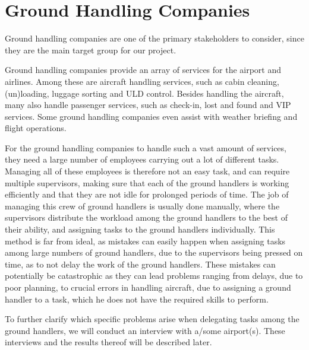 \section{Ground Handling Companies}
Ground handling companies are one of the primary stakeholders to consider, since they are the main target group for our project.

Ground handling companies provide an array of services for the airport and airlines. Among these are aircraft handling services, such as cabin cleaning, (un)loading, luggage sorting and ULD control. Besides handling the aircraft, many also handle passenger services, such as check-in, lost and found and VIP services. Some ground handling companies even assist with weather briefing and flight operations.

For the ground handling companies to handle such a vast amount of services, they need a large number of employees carrying out a lot of different tasks. Managing all of these employees is therefore not an easy task, and can require multiple supervisors, making sure that each of the ground handlers is working efficiently and that they are not idle for prolonged periods of time. The job of managing this crew of ground handlers is usually done manually, where the supervisors distribute the workload among the ground handlers to the best of their ability, and assigning tasks to the ground handlers individually.
This method is far from ideal, as mistakes can easily happen when assigning tasks among large numbers of ground handlers, due to the supervisors being pressed on time, as to not delay the work of the ground handlers. These mistakes can potentially be catastrophic as they can lead problems ranging from delays, due to poor planning, to crucial errors in handling aircraft, due to assigning a ground handler to a task, which he does not have the required skills to perform.

To further clarify which specific problems arise when delegating tasks among the ground handlers, we will conduct an interview with a/some airport(s). These interviews and the results thereof will be described later.